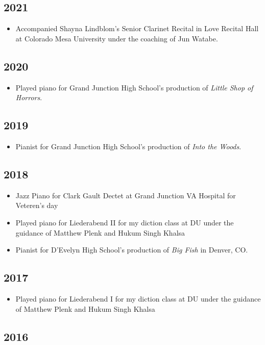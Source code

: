 \documentclass{article}
\newcommand{\cvItem}[1]{
        \item {
            {#1}
        }
    }
\newcommand{\cvItemListStart}{\begin{itemize}[leftmargin=10pt]}
\newcommand{\cvItemListEnd}{\end{itemize}}
\begin{document}
        \subsection{2021}
            \cvItemListStart
                \cvItem{Accompanied Shayna Lindblom's Senior Clarinet Recital in Love Recital Hall
                at Colorado Mesa University under the coaching of Jun Watabe.}
            \cvItemListEnd
        \subsection{2020}
            \cvItemListStart
                \cvItem{Played piano for Grand Junction High School's production of {\em Little Shop
                of Horrors}.}
            \cvItemListEnd
        \subsection{2019}
            \cvItemListStart
                \cvItem{Pianist for Grand Junction High School's production of {\em Into the
                Woods}.}
            \cvItemListEnd
        \subsection{2018}
            \cvItemListStart
                \cvItem{Jazz Piano for Clark Gault Dectet at Grand Junction VA Hospital for
                Veteren's day}
                \cvItem{Played piano for Liederabend II for my diction class at DU under the guidance
                of Matthew Plenk and Hukum Singh Khalsa}
                \cvItem{Pianist for D'Evelyn High School's production of {\em Big Fish} in Denver, CO.}
            \cvItemListEnd
        \subsection{2017}
            \cvItemListStart
                \cvItem{Played piano for Liederabend I for my diction class at DU under the guidance
                of Matthew Plenk and Hukum Singh Khalsa}
            \cvItemListEnd
        \subsection{2016}
\end{document}
